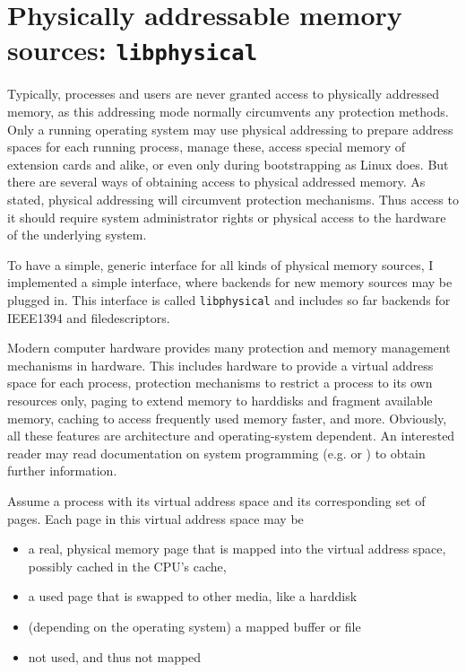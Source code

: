 %
%

\section{Physically addressable memory sources: \texttt{libphysical}}

Typically, processes and users are never granted access to physically addressed
memory, as this addressing mode normally circumvents any protection methods.
Only a running operating system may use physical addressing to prepare address
spaces for each running process, manage these, access special memory of
extension cards and alike, or even only during bootstrapping as Linux does. But
there are several ways of obtaining access to physical addressed memory. As
stated, physical addressing will circumvent protection mechanisms. Thus access
to it should require system administrator rights or physical access to the
hardware of the underlying system.

To have a simple, generic interface for all kinds of physical memory sources, I
implemented a simple interface, where backends for new memory sources may be
plugged in. This interface is called \texttt{libphysical} and includes so far
backends for IEEE1394 and filedescriptors.

Modern computer hardware provides many protection and memory management
mechanisms in hardware. This includes hardware to provide a virtual address
space for each process, protection mechanisms to restrict a process to its own
resources only, paging to extend memory to harddisks and fragment available
memory, caching to access frequently used memory faster, and more. Obviously,
all these features are architecture and operating-system dependent. An
interested reader may read documentation on system programming (e.g.
\cite{rwth_syspro_scriptum:2002} or \cite{IA32_SDM_3a:2006,IA32_SDM_3b:2006}) to
obtain further information.

Assume a process with its virtual address space and its corresponding set of
pages. Each page in this virtual address space may be

\begin{itemize}

	\item a real, physical memory page that is mapped into the virtual 
		address space, possibly cached in the CPU's cache,

	\item a used page that is swapped to other media, like a harddisk

	\item (depending on the operating system) a mapped buffer or file

	\item not used, and thus not mapped

\end{itemize}

